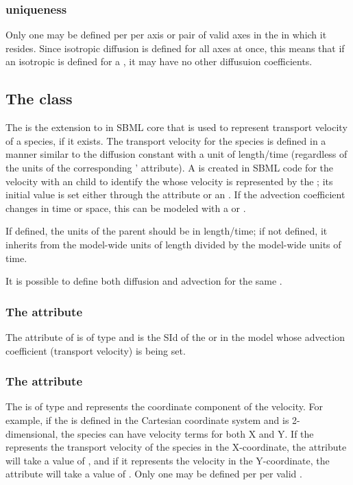 \subsubsection{\DiffusionCoefficient uniqueness}
Only one \DiffusionCoefficient may be defined per \Species per axis or pair of valid axes in the \Compartment in which it resides.  Since isotropic diffusion is defined for all axes at once, this means that if an isotropic \DiffusionCoefficient is defined for a \Species, it may have no other diffusuion coefficients.


\subsection{The  class}
\label{advectioncoefficient-class}
The \AdvectionCoefficient is the extension to \Parameter in SBML core that is used to represent transport velocity of a species, if it exists. The transport velocity for the species is defined in a manner similar to the diffusion constant with a unit of length/time (regardless of the units of the corresponding \Species'  attribute).  A \Parameter is created in SBML code for the velocity with an \AdvectionCoefficient child to identify the \Species whose velocity is represented by the \Parameter; its initial value is set either through the  attribute or an \InitialAssignment.    If the advection coefficient changes in time or space, this can be modeled with a \Rule or \Event.

If defined, the units of the parent \Parameter should be in length/time; if not defined, it inherits from the model-wide units of length divided by the model-wide units of time.

It is possible to define both diffusion and advection for the same \Species.

\subsubsection{The \fixttspace{} attribute}
The  attribute of \AdvectionCoefficient is of type  and is the SId of the \Species or \Parameter in the model whose advection coefficient (transport velocity) is being set.

\subsubsection{The \fixttspace{} attribute}
The  is of type  and represents the coordinate component of the velocity. For example, if the \Geometry is defined in the Cartesian coordinate system and is 2-dimensional, the species can have velocity terms for both X and Y. If the \Parameter represents the transport velocity of the species in the X-coordinate, the  attribute will take a value of , and if it represents the velocity in the Y-coordinate, the attribute will take a value of .  Only one \AdvectionCoefficient may be defined per \Species per valid .


